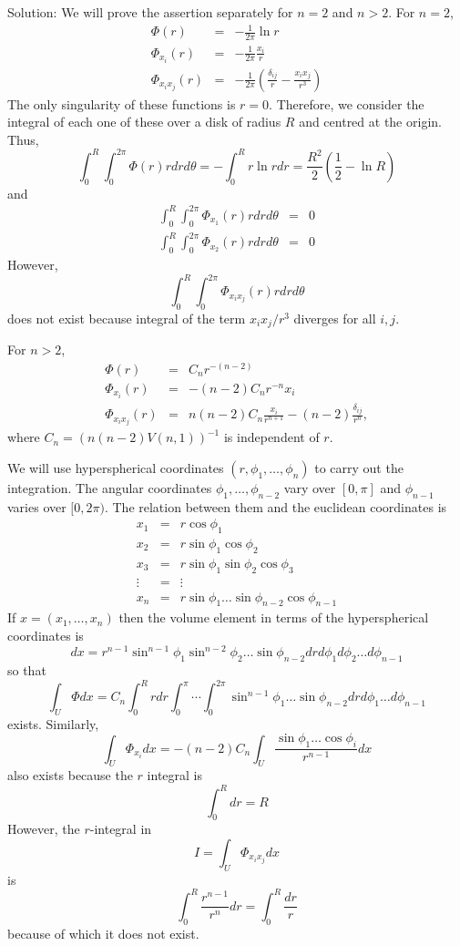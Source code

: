 \documentclass{article}
\theoremstyle{plain}
\numberwithin{thm}{section}
\theoremstyle{plain}
\numberwithin{prop}{section}
\theoremstyle{definition}
\numberwithin{defn}{section}
\theoremstyle{remark}
\numberwithin{equation}{section}
\begin{document}
\begin{enumerate}
Solution: We will prove the assertion separately for $n=2$ and $n > 2$. For $n=2$,
\begin{eqnarray*}
\Phi(r) &=& -\frac{1}{2\pi}\ln r \\
\Phi_{x_i}(r) &=& -\frac{1}{2\pi}\frac{x_i}{r} \\
\Phi_{x_ix_j}(r) &=& -\frac{1}{2\pi}\left(\frac{\delta_{ij}}{r} - \frac{x_ix_j}{r^3}\right)
\end{eqnarray*}
The only singularity of these functions is $r = 0$. Therefore, we consider the integral of each one of these over
a disk of radius $R$ and centred at the origin. Thus,
\[
\int_0^R\int_0^{2\pi}\Phi(r) rdrd\theta = -\int_0^Rr\ln r dr = \frac{R^2}{2}\left(\frac{1}{2} - \ln R\right)
\]
and
\begin{eqnarray*}
\int_0^R\int_0^{2\pi}\Phi_{x_1}(r) rdrd\theta &=& 0 \\
\int_0^R\int_0^{2\pi}\Phi_{x_2}(r) rdrd\theta &=& 0
\end{eqnarray*}
However,
\[
\int_0^R\int_0^{2\pi}\Phi_{x_ix_j}(r) rdrd\theta
\]
does not exist because integral of the term $x_ix_j/r^3$ diverges for all $i, j$. 

For $n > 2$, 
\begin{eqnarray*}
\Phi(r) &=& C_n r^{-(n-2)} \\
\Phi_{x_i}(r) &=& -(n-2)C_n r^{-n} x_i \\
\Phi_{x_ix_j}(r) &=& n(n-2)C_n \frac{x_i}{r^{n+1}} - (n-2)\frac{\delta_{ij}}{r^n},
\end{eqnarray*}
where $C_n = (n(n-2)V(n, 1))^{-1}$ is independent of $r$.

We will use hyperspherical coordinates $(r, \phi_1, \ldots, \phi_n)$ to carry out the integration. The angular
coordinates $\phi_1, \ldots, \phi_{n-2}$ vary over $[0, \pi]$ and $\phi_{n-1}$ varies over $[0, 2\pi)$. The 
relation between them and the euclidean coordinates is 
\begin{eqnarray*}
x_1 &=& r\cos\phi_1 \\
x_2 &=& r\sin\phi_1\cos\phi_2 \\
x_3 &=& r\sin\phi_1\sin\phi_2\cos\phi_3 \\
\vdots &=& \vdots \\
x_n &=& r\sin\phi_1\ldots\sin\phi_{n-2}\cos\phi_{n-1}
\end{eqnarray*}
If $x = (x_1, \ldots, x_n)$ then the volume element in terms of the hyperspherical coordinates is
\[
dx = r^{n-1}\sin^{n-1}\phi_1\sin^{n-2}\phi_2 \ldots \sin\phi_{n-2} drd\phi_1d\phi_2\ldots d\phi_{n-1}
\]
so that
\[
\int_U \Phi dx = C_n\int_0^R rdr \int_0^{\pi} \cdots \int_0^{2\pi}  
\sin^{n-1}\phi_1 \ldots \sin\phi_{n-2} drd\phi_1\ldots d\phi_{n-1}
\]
exists. Similarly,
\[
\int_U \Phi_{x_i}dx = -(n-2)C_n \int_U \frac{\sin\phi_1\ldots\cos\phi_{i}}{r^{n-1}}dx
\]
also exists because the $r$ integral is
\[
\int_0^R  dr = R
\]
However, the $r$-integral in
\[
I = \int_U \Phi_{x_ix_j}dx
\]
is
\[
\int_0^R \frac{r^{n-1}}{r^n}dr = \int_0^R \frac{dr}{r}
\]
because of which it does not exist.


\end{enumerate}
\end{document}

